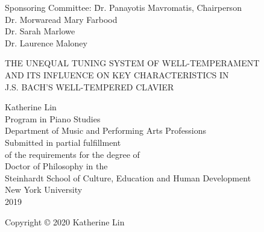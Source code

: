 \documentclass[11pt,letterpaper]{report}
\begin{document}
\title{}
\author{}


\begin{titlepage}
    \thispagestyle{empty}
    \begin{singlespace}\centering\normalsize
        \begin{tabbing}
        \hspace{10ex}Sponsoring Committee: \= Dr. Panayotis Mavromatis, Chairperson\\
        \>Dr. Morwaread Mary Farbood\\
        \>Dr. Sarah Marlowe\\
        \>Dr. Laurence Maloney\\
        \end{tabbing}
        \vspace{1in}
        \begin{doublespace}
            THE UNEQUAL TUNING SYSTEM OF WELL-TEMPERAMENT \\
            AND ITS INFLUENCE ON KEY CHARACTERISTICS IN \\
            J.S. BACH'S WELL-TEMPERED CLAVIER
        \end{doublespace}
        \vspace{1in}
        Katherine Lin \\
        \vspace{.25in}
        Program in Piano Studies \\
        Department of Music and Performing Arts Professions\\
        \vfill
        Submitted in partial fulfillment \\
        of the requirements for the degree of \\
        Doctor of Philosophy in the \\
        Steinhardt School of Culture, Education and Human Development \\
        New York University \\
        2019 \\
    \end{singlespace}
\end{titlepage}
\setcounter{page}{2}

\newpage
\thispagestyle{empty}
\begin{center}
    Copyright \copyright{} 2020 Katherine Lin
\end{center}
\end{document}

